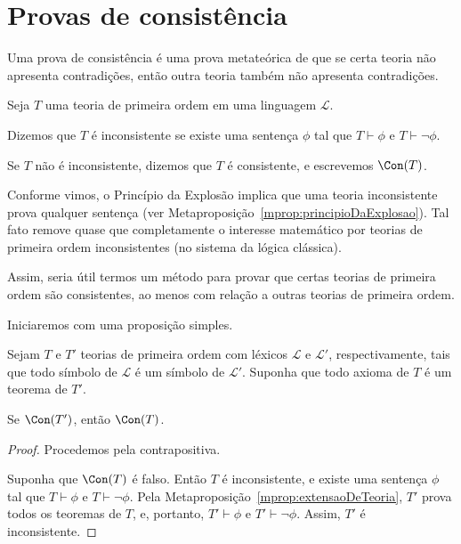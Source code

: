 \section{Provas de consistência}\label{sec:provasDeConsistencia}
Uma prova de consistência é uma prova metateórica de que se certa teoria não apresenta contradições, então outra teoria também não apresenta contradições.

\begin{metadefinition}
    Seja $T$ uma teoria de primeira ordem em uma linguagem $\mathcal L$.

    Dizemos que $T$ é inconsistente se existe uma sentença $\phi$ tal que $T\vdash \phi$ e $T\vdash \neg \phi$.

    Se $T$ não é inconsistente, dizemos que $T$ é consistente, e escrevemos $\Con(T)$.
\end{metadefinition}

Conforme vimos, o Princípio da Explosão implica que uma teoria inconsistente prova qualquer sentença (ver Metaproposição~\ref{mprop:principioDaExplosao}).
Tal fato remove quase que completamente o interesse matemático por teorias de primeira ordem inconsistentes (no sistema da lógica clássica).

Assim, seria útil termos um método para provar que certas teorias de primeira ordem são consistentes, ao menos com relação a outras teorias de primeira ordem.

Iniciaremos com uma proposição simples.

\begin{metaproposition}\label{mprop:consistenciaDeTeoriasMaisFracas}
    Sejam $T$ e $T'$ teorias de primeira ordem com léxicos $\mathcal L$ e $\mathcal L'$, respectivamente, tais que todo símbolo de $\mathcal L$ é um símbolo de $\mathcal L'$.
    Suponha que todo axioma de $T$ é um teorema de $T'$.
    
    Se $\Con(T')$, então $\Con(T)$.
\end{metaproposition}

\begin{proof}
    Procedemos pela contrapositiva.

    Suponha que $\Con(T)$ é falso.
    Então $T$ é inconsistente, e existe uma sentença $\phi$ tal que $T\vdash \phi$ e $T\vdash \neg \phi$.
    Pela Metaproposição~\ref{mprop:extensaoDeTeoria}, $T'$ prova todos os teoremas de $T$, e, portanto, $T'\vdash \phi$ e $T'\vdash \neg \phi$.
    Assim, $T'$ é inconsistente.
\end{proof}

